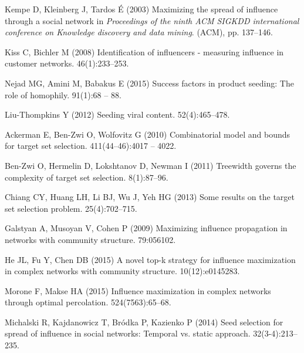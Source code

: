 \documentclass[11pt]{article} %
\begin{document}
%
%
\begin{thebibliography}{10}

Kempe D, Kleinberg J, Tardos {\'E} (2003) Maximizing the spread of influence
  through a social network in {\em Proceedings of the ninth ACM SIGKDD
  international conference on Knowledge discovery and data mining}.
\newblock (ACM), pp. 137--146.

Kiss C, Bichler M (2008) Identification of influencers - measuring influence in
  customer networks.
 46(1):233--253.

Nejad MG, Amini M, Babakus E (2015) Success factors in product seeding: The
  role of homophily.
 91(1):68 -- 88.

Liu-Thompkins Y (2012) Seeding viral content.
 52(4):465--478.

Ackerman E, Ben-Zwi O, Wolfovitz G (2010) Combinatorial model and bounds for
  target set selection.
 411(44–46):4017 -- 4022.

Ben-Zwi O, Hermelin D, Lokshtanov D, Newman I (2011) Treewidth governs the
  complexity of target set selection.
 8(1):87--96.

Chiang CY, Huang LH, Li BJ, Wu J, Yeh HG (2013) Some results on the target set
  selection problem.
 25(4):702--715.

Galstyan A, Musoyan V, Cohen P (2009) Maximizing influence propagation in
  networks with community structure.
 79:056102.

He JL, Fu Y, Chen DB (2015) A novel top-k strategy for influence maximization
  in complex networks with community structure.
 10(12):e0145283.

Morone F, Makse HA (2015) {Influence maximization in complex networks through
  optimal percolation}.
 524(7563):65--68.

Michalski R, Kajdanowicz T, Br{\'o}dka P, Kazienko P (2014) Seed selection for
  spread of influence in social networks: Temporal vs. static approach.
 32(3-4):213--235.


\end{thebibliography}
\end{document}
